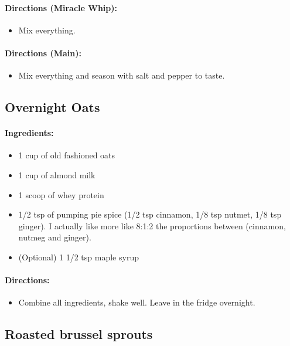 \documentclass{article}
\begin{document}
\paragraph{Directions (Miracle Whip):}
\begin{itemize}
    \item Mix everything.
\end{itemize}  

\paragraph{Directions (Main):}
\begin{itemize}
    \item Mix everything and season with salt and pepper to taste.
\end{itemize} 

\subsection{Overnight Oats}

\paragraph{Ingredients:}
\begin{itemize}
    \item 1 cup of old fashioned oats
    \item 1 cup of almond milk
    \item 1 scoop of whey protein
    \item 1/2 tsp of pumping pie spice (1/2 tsp cinnamon, 1/8 tsp nutmet, 1/8 tsp ginger). I actually like more like 8:1:2 the proportions between (cinnamon, nutmeg and ginger).
    \item (Optional) 1 1/2 tsp maple syrup
\end{itemize}

\paragraph{Directions:}
\begin{itemize}
    \item Combine all ingredients, shake well. Leave in the fridge overnight.
\end{itemize}

\subsection{Roasted brussel sprouts}
\end{document}
